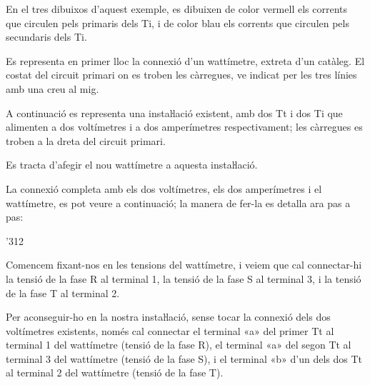 \begin{exemple}
    En el tres dibuixos d'aquest exemple, es dibuixen de color vermell els corrents que circulen pels primaris dels Ti, i de color blau els corrents que circulen pels secundaris dels Ti.

    Es representa en primer lloc la connexió d'un wattímetre, extreta
    d'un catàleg.   El costat del circuit primari on es troben les càrregues, ve indicat
    per les tres línies amb una creu al mig.

    \begin{center}
        
    \end{center}

    A continuació es representa una instaŀlació existent, amb dos Tt i
    dos Ti que alimenten a dos voltímetres i a dos amperímetres
    respectivament; les càrregues es troben a la dreta del circuit
    primari.

    \begin{center}
        
    \end{center}

    Es tracta d'afegir el nou wattímetre a aquesta
    instaŀlació.

    La connexió completa amb els dos voltímetres, els dos amperímetres i el wattímetre, es pot veure a continuació; la manera de fer-la es detalla ara pas a pas:

    \begin{dingautolist}{'312}

    \item Comencem fixant-nos en les tensions del wattímetre, i veiem que cal
    connectar-hi la tensió de la fase R al terminal 1, la tensió de la
    fase S al terminal 3, i la tensió de la fase T al terminal 2.

    Per aconseguir-ho en la nostra instaŀlació, sense tocar la
    connexió dels dos voltímetres existents, només cal connectar
    el terminal «\textsf{a}» del primer Tt al terminal 1 del wattímetre (tensió de
    la fase R), el terminal «\textsf{a}» del segon Tt al terminal 3 del wattímetre
    (tensió de la fase S), i el terminal «\textsf{b}» d'un dels dos Tt
    al terminal 2 del wattímetre (tensió de la fase T).


\end{dingautolist}
\end{exemple}
